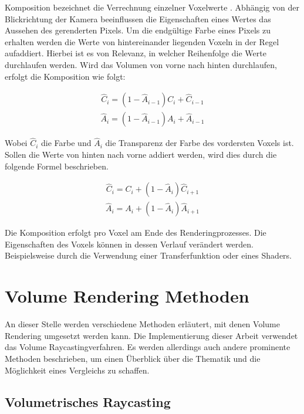 Komposition bezeichnet die Verrechnung einzelner Voxelwerte \cite{Fernando04}. Abhängig von der Blickrichtung der Kamera beeinflussen die Eigenschaften eines Wertes das Aussehen des gerenderten Pixels. Um die endgültige Farbe eines Pixels zu erhalten werden die Werte von hintereinander liegenden Voxeln in der Regel aufaddiert. Hierbei ist es von Relevanz, in welcher Reihenfolge die Werte durchlaufen werden. Wird das Volumen von vorne nach hinten durchlaufen, erfolgt die Komposition wie folgt:

\begin{align}
\hat{C}_{i}=(1-\hat{A}_{i-1})C_{i}+\hat{C}_{i-1}
\end{align}
\begin{align}
\hat{A}_{i}=(1-\hat{A}_{i-1})A_{i}+\hat{A}_{i-1}
\end{align}


Wobei $\hat{C}_{i}$ die Farbe und $\hat{A}_{i}$ die Transparenz der Farbe des vordersten Voxels ist.
Sollen die Werte von hinten nach vorne addiert werden, wird dies durch die folgende Formel beschrieben.

\begin{align}
\hat{C}_{i}=C_{i}+(1-\hat{A}_{i})\hat{C}_{i+1}
\end{align}
\begin{align}
\hat{A}_{i}=A_{i}+(1-\hat{A}_{i})\hat{A}_{i+1}
\end{align}

Die Komposition erfolgt pro Voxel am Ende des Renderingprozesses. Die Eigenschaften des Voxels können in dessen Verlauf verändert werden. Beispielsweise durch die Verwendung einer Transferfunktion oder eines Shaders.


\section{Volume Rendering Methoden}

An dieser Stelle werden verschiedene Methoden erläutert, mit denen Volume Rendering umgesetzt werden kann. Die Implementierung dieser Arbeit verwendet das Volume Raycastingverfahren. Es werden allerdings auch andere prominente Methoden beschrieben, um einen Überblick über die Thematik und die Möglichkeit eines Vergleichs zu schaffen.

\subsection{Volumetrisches Raycasting}
\label{rayCasting}

